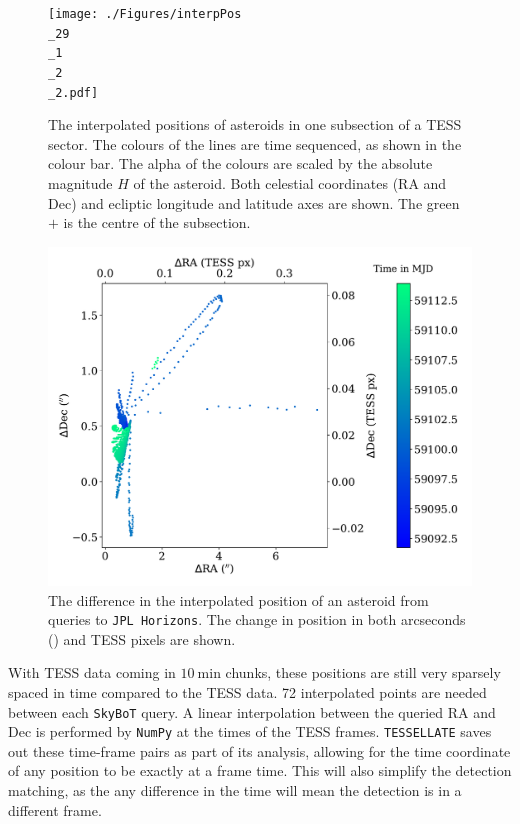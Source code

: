 \documentclass{UCreport}
\begin{document}
\begin{figure}[t!]
  \centering
  \texttt{[image: ./Figures/interpPos\\\_29\\\_1\\\_2\\\_2.pdf]}
  \caption[Interpolated Positions of Asteroids on Sky]{
    The interpolated positions of asteroids in one subsection of a TESS sector.
    The colours of the lines are time sequenced, as shown in the colour bar.
    The alpha of the colours are scaled by the absolute magnitude $H$ of the asteroid.
    Both celestial coordinates (RA and Dec) and ecliptic longitude and latitude  axes are shown.
    The green $+$ is the centre of the subsection.}
  \label{Fig:interpPos}
\end{figure}


\begin{figure}[t]
  \centering
  \includegraphics[width =0.8 \textwidth]{./Figures/1990 KC1PosCheck.pdf} %
  \caption[Interpolated Position Verification]{
    The difference in the interpolated position of an asteroid from queries to \texttt{JPL Horizons}.
    The change in position in both arcseconds (\unit{\arcsec}) and TESS pixels are shown.
  }\label{Fig:errPos}
\end{figure}

With TESS data coming in $\qty{10}{\minute}$ chunks, these positions are still very sparsely spaced in time compared to the TESS data.
72 interpolated points are needed between each \texttt{SkyBoT} query.
A linear interpolation between the queried RA and Dec is performed by \texttt{NumPy} \citep{Harris2020} at the times of the TESS frames.
\texttt{TESSELLATE} saves out these time-frame pairs as part of its analysis, allowing for the time coordinate of any position to be exactly at a frame time.
This will also simplify the detection matching, as the any difference in the time will mean the detection is in a different frame.
\end{document}
